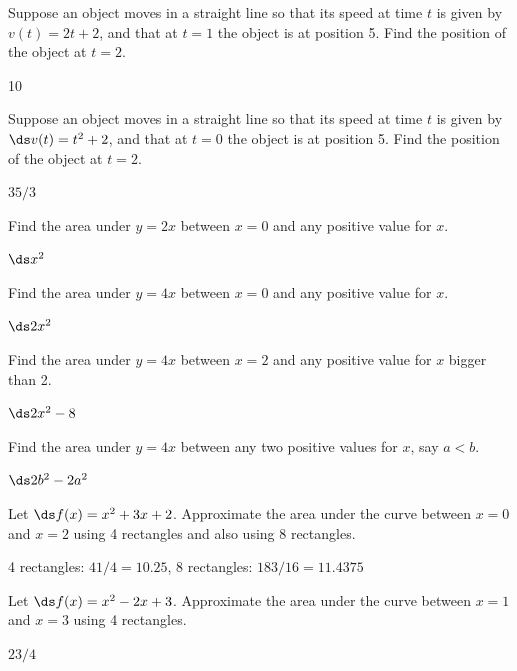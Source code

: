 \begin{enumialphparenastyle}

\begin{ex}
 Suppose an object moves in a straight line so that its speed at
time $t$ is given by $v(t)=2t+2$, and that at $t=1$ the object is at
position 5. Find the position of the object at $t=2$.
\begin{sol}
 10
\end{sol}
\end{ex}

\begin{ex}
 Suppose an object moves in a straight line so that its speed at
time $t$ is given by $\ds v(t)=t^2+2$, and that at $t=0$ the object is at
position 5. Find the position of the object at $t=2$.
\begin{sol}
 $35/3$
\end{sol}
\end{ex}

\begin{ex}
  Find the area under $y=2x$ between $x=0$ and any
  positive value for $x$.
\begin{sol}
 $\ds x^2$
\end{sol}
\end{ex}

\begin{ex}
  Find the area under $y=4x$ between $x=0$ and any
  positive value for $x$.
\begin{sol}
 $\ds 2x^2$
\end{sol}
\end{ex}

\begin{ex} 
  Find the area under $y=4x$ between $x=2$ and any
  positive value for $x$ bigger than 2.
\begin{sol}
 $\ds 2x^2-8$
\end{sol}
\end{ex}

\begin{ex}
  Find the area under $y=4x$ between any two positive
  values for $x$, say $a<b$.
\begin{sol}
 $\ds 2b^2-2a^2$
\end{sol}
\end{ex}

\begin{ex}
 Let $\ds f(x)=x^2+3x+2$. Approximate the area under the curve
between $x=0$ and $x=2$ using 4 rectangles and also using 8
rectangles. 
\begin{sol}
 4 rectangles: $41/4=10.25$, 
8 rectangles: $183/16= 11.4375$
\end{sol}
\end{ex}

\begin{ex}
 Let $\ds f(x)=x^2-2x+3$. Approximate the area under the curve
between $x=1$ and $x=3$ using 4 rectangles. 
\begin{sol}
 $ 23/4$
\end{sol}
\end{ex}

\end{enumialphparenastyle}